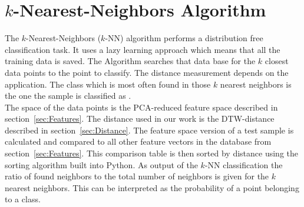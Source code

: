 \section{$k$-Nearest-Neighbors Algorithm}
\label{sec:TheoryKnn}
The $k$-Nearest-Neighbors ($k$-NN) algorithm performs a distribution free classification task. It uses a lazy learning approach which means that all the training data is saved. The Algorithm searches that data base for the $k$ closest data points to the point to classify. The distance measurement depends on the application. The class which is most often found in those $k$ nearest neighbors is the one the sample is classified as \cite[p.~338~f.]{bib:Alzate2007}.\\
The space of the data points is the PCA-reduced feature space described in section~\ref{sec:Features}. The distance used in our work is the DTW-distance described in section~\ref{sec:Distance}. The feature space version of a test sample is calculated and compared to all other feature vectors in the database from section~\ref{sec:Features}. This comparison table is then sorted by distance using the sorting algorithm built into Python. As output of the $k$-NN classification the ratio of found neighbors to the total number of neighbors is given for the $k$ nearest neighbors. This can be interpreted as the probability of a point belonging to a class.
